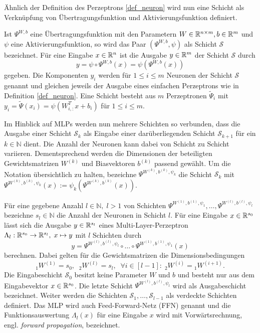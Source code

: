 Ähnlich der Definition des Perzeptrons \ref{def_neuron} wird nun eine Schicht als Verknüpfung von Übertragungsfunktion und Aktivierungsfunktion definiert.

\begin{defi}[Neuronenschicht]
    Ist $\Psi^{W,b}$ eine Übertragungsfunktion mit den Parametern $W \in \mathbb{R}^{n \times m}, b \in \mathbb{R}^m$ und $\psi$ eine Aktivierungsfunktion, so wird das Paar $(\Psi^{W,b}, \psi)$ als Schicht $\mathcal{S}$ bezeichnet. Für eine Eingabe $x \in \mathbb{R}^n$ ist die Ausgabe $y \in \mathbb{R}^m$ der Schicht $\mathcal{S}$ durch
    \[y=\psi \circ \Psi^{W,b}(x)= \psi\left(\Psi^{W,b}(x)\right)
        \] 
        gegeben. Die Komponenten $y_i$ werden für $1 \leq i \leq m$ Neuronen der Schicht $\mathcal{S}$ genannt und gleichen jeweils der Ausgabe eines einfachen Perzeptrons wie in Definition \ref{def_neuron}. Eine Schicht besteht aus $m$ Perzeptronen $\tilde{\Psi}_i$ mit $y_i=\tilde{\Psi}(x_i)=\psi(W_{i,:}^T x+b_i)$ für $1 \leq i \leq m$.
\end{defi}
Im Hinblick auf MLPs werden nun mehrere Schichten so verbunden, dass die Ausgabe einer Schicht $\mathcal{S}_k$ als Eingabe einer darüberliegenden Schicht $\mathcal{S}_{k+1}$ für ein $k \in \mathbb{N}$ dient. Die Anzahl der Neuronen kann dabei von Schicht zu Schicht variieren. Dementsprechend werden die Dimensionen der beteiligten Gewichtsmatrizen $W^{(k)}$ und Biasvektoren $b^{(k)}$ passend gewählt. 
Um die Notation übersichtlich zu halten, bezeichne $\Psi^{W^{(k)},b^{(k)},\psi_{k}}$ die Schicht $\mathcal{S}_k$ mit $\Psi^{W^{(k)},b^{(k)},\psi_{k}}(x):= \psi_{k} \left(\Psi^{W^{(k)},b^{(k)}}(x)\right)$.

\begin{defi}
    Für eine gegebene Anzahl $l \in \mathbb{N}, \; l>1$ von Schichten $\Psi^{W^{(1)},b^{(1)},\psi_{1}}, \ldots, \Psi^{W^{(l)},b^{(l)},\psi_{l}}$ bezeichne $s_l \in \mathbb{N}$ die Anzahl der Neuronen in Schicht $l$. Für eine Eingabe $x \in \mathbb{R}^{s_0}$ lässt sich die Ausgabe $y \in \mathbb{R}^{s_l}$ eines Multi-Layer-Perzeptron  $\Lambda_l: \mathbb{R}^{s_0} \rightarrow \mathbb{R}^{s_l}, \; x \mapsto y$ mit $l$ Schichten durch
    \[
        y=\Psi^{W^{(l)},b^{(l)},\psi_{l}} \circ \ldots \circ \Psi^{W^{(1)},b^{(1)},\psi_{1}}(x)
    \]
    berechnen. Dabei gelten für die Gewichtsmatrizen die Dimensionsbedingungen
    \[{}_1W^{(1)}=s_0, \; \; {}_2W^{(l)}=s_l, \; \; \forall i \in [l-1]: \; {}_2W^{(i)}={}_1W^{(i+1)}.
        \] 
    Die Eingabeschicht $\mathcal{S}_0$ besitzt keine Parameter $W$ und $b$ und besteht nur aus dem Eingabevektor $x \in \mathbb{R}^{s_0}$. Die letzte Schicht $\Psi^{W^{(l)},b^{(l)},\psi_{l}}$ wird als Ausgabeschicht bezeichnet. Weiter werden die Schichten $\mathcal{S}_1, \ldots, \mathcal{S}_{l-1}$ als verdeckte Schichten definiert. Das MLP wird auch Feed-Forward-Netz (FFN)  genannt und die Funktionsauswertung $\Lambda_l(x)$ für eine Eingabe $x$ wird mit Vorwärtsrechnung, engl. \textit{forward propagation}, bezeichnet.
\end{defi}

